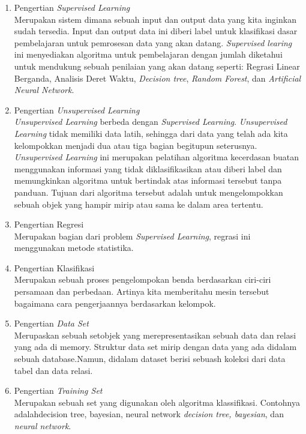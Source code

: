 \documentclass{article}
\begin{document}
\begin{enumerate}

    \item Pengertian \textit{Supervised Learning}\\
    Merupakan sistem dimana sebuah input dan output data yang kita inginkan sudah tersedia. Input dan output data ini diberi label untuk klasifikasi dasar pembelajaran untuk pemrosesan data yang akan datang. \textit{Supervised learing} ini menyediakan algoritma untuk pembelajaran dengan jumlah diketahui untuk mendukung sebuah penilaian yang akan datang seperti: Regrasi Linear Berganda, Analisis Deret Waktu, \textit{Decision tree}, \textit{Random Forest}, dan \textit{Artificial Neural Network}.
    
    \item Pengertian \textit{Unsupervised Learning}\\
    \textit{Unsupervised Learning} berbeda dengan \textit{Supervised Learning}. \textit{Unsupervised Learning} tidak memiliki data latih, sehingga dari data yang telah ada kita kelompokkan menjadi dua atau tiga bagian begitupun seterusnya. \textit{Unsupervised Learning} ini merupakan pelatihan algoritma kecerdasan buatan menggunakan informasi yang tidak diklasifikasikan atau diberi label dan memungkinkan algoritma untuk bertindak atas informasi tersebut tanpa panduan. Tujuan dari algoritma tersebut adalah untuk mengelompokkan sebuah objek yang hampir mirip atau sama ke dalam area tertentu.
    
    \item Pengertian Regresi\\
    Merupakan bagian dari problem \textit{Supervised Learning}, regrasi ini menggunakan metode statistika.
    
    \item Pengertian Klasifikasi\\
    Merupakan sebuah proses pengelompokan benda berdasarkan ciri-ciri persamaan dan perbedaan. Artinya kita memberitahu mesin tersebut bagaimana cara pengerjaannya berdasarkan kelompok.
    
    \item Pengertian \textit{Data Set}\\
    Merupaskan sebuah setobjek yang merepresentasikan sebuah data dan relasi yang ada di memory. Struktur data set mirip dengan data yang ada didalam sebuah database.Namun, didalam dataset berisi sebuash koleksi dari data tabel dan data relasi.
    
    \item Pengertian \textit{Training Set}\\
    Merupakan sebuah set yang digunakan oleh algoritma klassifikasi. Contohnya adalahdecision tree, bayesian, neural network \textit{decision tree, bayesian}, dan \textit{neural network}.
    

\end{enumerate}
\end{document}
